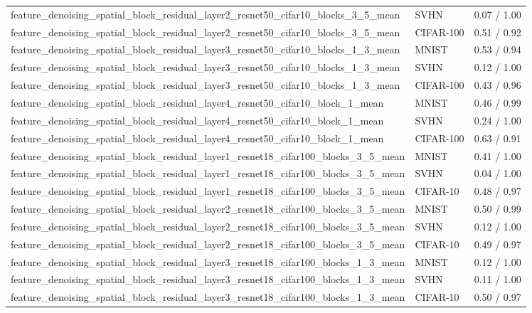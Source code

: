 \begin{tabular}{lll}
feature\_denoising\_spatial\_block\_residual\_layer2\_resnet50\_cifar10\_blocks\_3\_5\_mean & SVHN & 0.07 / 1.00 \\
feature\_denoising\_spatial\_block\_residual\_layer2\_resnet50\_cifar10\_blocks\_3\_5\_mean & CIFAR-100 & 0.51 / 0.92 \\
feature\_denoising\_spatial\_block\_residual\_layer3\_resnet50\_cifar10\_blocks\_1\_3\_mean & MNIST & 0.53 / 0.94 \\
feature\_denoising\_spatial\_block\_residual\_layer3\_resnet50\_cifar10\_blocks\_1\_3\_mean & SVHN & 0.12 / 1.00 \\
feature\_denoising\_spatial\_block\_residual\_layer3\_resnet50\_cifar10\_blocks\_1\_3\_mean & CIFAR-100 & 0.43 / 0.96 \\
feature\_denoising\_spatial\_block\_residual\_layer4\_resnet50\_cifar10\_block\_1\_mean & MNIST & 0.46 / 0.99 \\
feature\_denoising\_spatial\_block\_residual\_layer4\_resnet50\_cifar10\_block\_1\_mean & SVHN & 0.24 / 1.00 \\
feature\_denoising\_spatial\_block\_residual\_layer4\_resnet50\_cifar10\_block\_1\_mean & CIFAR-100 & 0.63 / 0.91 \\
feature\_denoising\_spatial\_block\_residual\_layer1\_resnet18\_cifar100\_blocks\_3\_5\_mean & MNIST & 0.41 / 1.00 \\
feature\_denoising\_spatial\_block\_residual\_layer1\_resnet18\_cifar100\_blocks\_3\_5\_mean & SVHN & 0.04 / 1.00 \\
feature\_denoising\_spatial\_block\_residual\_layer1\_resnet18\_cifar100\_blocks\_3\_5\_mean & CIFAR-10 & 0.48 / 0.97 \\
feature\_denoising\_spatial\_block\_residual\_layer2\_resnet18\_cifar100\_blocks\_3\_5\_mean & MNIST & 0.50 / 0.99 \\
feature\_denoising\_spatial\_block\_residual\_layer2\_resnet18\_cifar100\_blocks\_3\_5\_mean & SVHN & 0.12 / 1.00 \\
feature\_denoising\_spatial\_block\_residual\_layer2\_resnet18\_cifar100\_blocks\_3\_5\_mean & CIFAR-10 & 0.49 / 0.97 \\
feature\_denoising\_spatial\_block\_residual\_layer3\_resnet18\_cifar100\_blocks\_1\_3\_mean & MNIST & 0.12 / 1.00 \\
feature\_denoising\_spatial\_block\_residual\_layer3\_resnet18\_cifar100\_blocks\_1\_3\_mean & SVHN & 0.11 / 1.00 \\
feature\_denoising\_spatial\_block\_residual\_layer3\_resnet18\_cifar100\_blocks\_1\_3\_mean & CIFAR-10 & 0.50 / 0.97 \\

\end{tabular}
